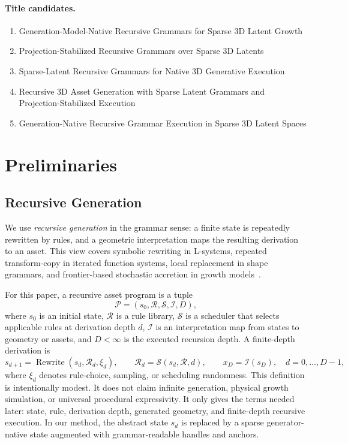 
\paragraph{Title candidates.}
\begin{enumerate}
  \item Generation-Model-Native Recursive Grammars for Sparse 3D Latent Growth
  \item Projection-Stabilized Recursive Grammars over Sparse 3D Latents
  \item Sparse-Latent Recursive Grammars for Native 3D Generative Execution
  \item Recursive 3D Asset Generation with Sparse Latent Grammars and Projection-Stabilized Execution
  \item Generation-Native Recursive Grammar Execution in Sparse 3D Latent Spaces
\end{enumerate}

\section{Preliminaries}

\subsection{Recursive Generation}
We use \emph{recursive generation} in the grammar sense: a finite state is repeatedly rewritten by rules, and a geometric interpretation maps the resulting derivation to an asset. This view covers symbolic rewriting in L-systems, repeated transform-copy in iterated function systems, local replacement in shape grammars, and frontier-based stochastic accretion in growth models~\cite{lindenmayer1968lsystemsI,prusinkiewicz1990abop,barnsley1988fractalsEverywhere,witten1981dla,sander2000dlaReview,runions2007spacecolonization,stiny1972shapegrammars,mueller2006procedural}. 

For this paper, a recursive asset program is a tuple
\[
\mathcal P=(s_0,\mathcal R,\mathcal S,\mathcal I,D),
\]
where $s_0$ is an initial state, $\mathcal R$ is a rule library, $\mathcal S$ is a scheduler that selects applicable rules at derivation depth $d$, $\mathcal I$ is an interpretation map from states to geometry or assets, and $D<\infty$ is the executed recursion depth. A finite-depth derivation is
\[
s_{d+1}=\operatorname{Rewrite}(s_d,\mathcal R_d,\xi_d),
\qquad
\mathcal R_d=\mathcal S(s_d,\mathcal R,d),
\qquad
x_D=\mathcal I(s_D),
\quad d=0,\ldots,D-1,
\]
where $\xi_d$ denotes rule-choice, sampling, or scheduling randomness. This definition is intentionally modest. It does not claim infinite generation, physical growth simulation, or universal procedural expressivity. It only gives the terms needed later: state, rule, derivation depth, generated geometry, and finite-depth recursive execution. In our method, the abstract state $s_d$ is replaced by a sparse generator-native state augmented with grammar-readable handles and anchors.

